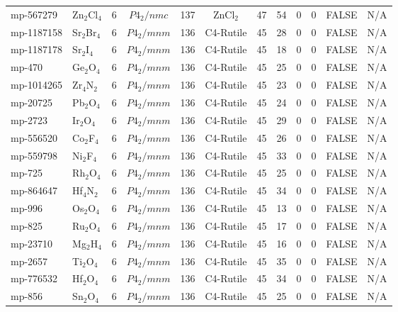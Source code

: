 {\begin{longtable}{llcccccccccc}
    mp-567279 & Zn$_{2}$Cl$_{4}$ & 6     & $P4_2/nmc$ & 137   & ZnCl$_{2}$ & 47    & 54    & 0     & 0     & FALSE & N/A \\
    mp-1187158 & Sr$_{2}$Br$_{4}$ & 6     & $P4_2/mnm$ & 136   & C4-Rutile & 45    & 28    & 0     & 0     & FALSE & N/A \\
    mp-1187178 & Sr$_{2}$I$_{4}$ & 6     & $P4_2/mnm$ & 136   & C4-Rutile & 45    & 18    & 0     & 0     & FALSE & N/A \\
    mp-470 & Ge$_{2}$O$_{4}$ & 6     & $P4_2/mnm$ & 136   & C4-Rutile & 45    & 25    & 0     & 0     & FALSE & N/A \\
    mp-1014265 & Zr$_{4}$N$_{2}$ & 6     & $P4_2/mnm$ & 136   & C4-Rutile & 45    & 23    & 0     & 0     & FALSE & N/A \\
    mp-20725 & Pb$_{2}$O$_{4}$ & 6     & $P4_2/mnm$ & 136   & C4-Rutile & 45    & 24    & 0     & 0     & FALSE & N/A \\
    mp-2723 & Ir$_{2}$O$_{4}$ & 6     & $P4_2/mnm$ & 136   & C4-Rutile & 45    & 29    & 0     & 0     & FALSE & N/A \\
    mp-556520 & Co$_{2}$F$_{4}$ & 6     & $P4_2/mnm$ & 136   & C4-Rutile & 45    & 26    & 0     & 0     & FALSE & N/A \\
    mp-559798 & Ni$_{2}$F$_{4}$ & 6     & $P4_2/mnm$ & 136   & C4-Rutile & 45    & 33    & 0     & 0     & FALSE & N/A \\
    mp-725 & Rh$_{2}$O$_{4}$ & 6     & $P4_2/mnm$ & 136   & C4-Rutile & 45    & 25    & 0     & 0     & FALSE & N/A \\
    mp-864647 & Hf$_{4}$N$_{2}$ & 6     & $P4_2/mnm$ & 136   & C4-Rutile & 45    & 34    & 0     & 0     & FALSE & N/A \\
    mp-996 & Os$_{2}$O$_{4}$ & 6     & $P4_2/mnm$ & 136   & C4-Rutile & 45    & 13    & 0     & 0     & FALSE & N/A \\
    mp-825 & Ru$_{2}$O$_{4}$ & 6     & $P4_2/mnm$ & 136   & C4-Rutile & 45    & 17    & 0     & 0     & FALSE & N/A \\
    mp-23710 & Mg$_{2}$H$_{4}$ & 6     & $P4_2/mnm$ & 136   & C4-Rutile & 45    & 16    & 0     & 0     & FALSE & N/A \\
    mp-2657 & Ti$_{2}$O$_{4}$ & 6     & $P4_2/mnm$ & 136   & C4-Rutile & 45    & 35    & 0     & 0     & FALSE & N/A \\
    mp-776532 & Hf$_{2}$O$_{4}$ & 6     & $P4_2/mnm$ & 136   & C4-Rutile & 45    & 34    & 0     & 0     & FALSE & N/A \\
    mp-856 & Sn$_{2}$O$_{4}$ & 6     & $P4_2/mnm$ & 136   & C4-Rutile & 45    & 25    & 0     & 0     & FALSE & N/A \\

\end{longtable}}
